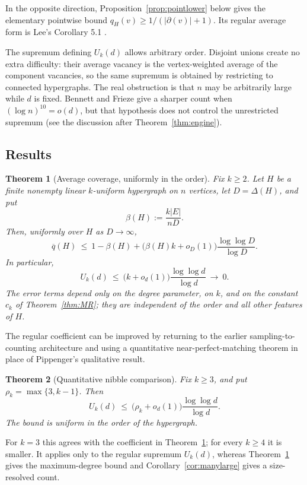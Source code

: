 \documentclass[10pt,a4paper]{amsart}
\newtheorem{theorem}{Theorem}[section]
\newcommand{\EE}{E}
\newcommand{\qbar}{\overline{q}}
\newcommand{\dg}{\partial}
\newcommand{\Deltaop}{\Delta}
\begin{document}
In the opposite direction, Proposition~\ref{prop:pointlower} below gives the elementary
pointwise bound $q_H(v)\ge1/(|\dg(v)|+1)$. Its regular average form is Lee's
Corollary 5.1 \cite[Corollary 5.1]{Lee}.

The supremum defining $U_k(d)$ allows arbitrary order. Disjoint unions create no extra
difficulty: their average vacancy is the vertex-weighted average of the component
vacancies, so the same supremum is obtained by restricting to connected hypergraphs. The
real obstruction is that $n$ may be arbitrarily large while $d$ is fixed. Bennett and
Frieze give a sharper count when $(\log n)^{10}=o(d)$, but that hypothesis does not control
the unrestricted supremum (see the discussion after Theorem~\ref{thm:engine}).

\subsection{Results}
\label{subsec:results}


\begin{theorem}[Average coverage, uniformly in the order]
\label{thm:main}
Fix $k\ge2$. Let $H$ be a finite nonempty linear $k$-uniform hypergraph on $n$ vertices,
let $D=\Deltaop(H)$, and put
\[
  \beta(H):=\frac{k|\EE|}{nD}.
\]
Then, uniformly over $H$ as $D\to\infty$,
\[
  \qbar(H)\ \le\ 1-\beta(H)
  +\bigl(\beta(H)k+o_D(1)\bigr)\frac{\log\log D}{\log D}.
\]
In particular,
\[
  U_k(d)\ \le\ \bigl(k+o_d(1)\bigr)\frac{\log\log d}{\log d}
  \ \longrightarrow\ 0.
\]
The error terms depend only on the degree parameter, on $k$, and on the constant $c_k$
of Theorem~\ref{thm:MR}; they are independent of the order and all other features of $H$.
\end{theorem}


The regular coefficient can be improved by returning to the earlier sampling-to-counting
architecture and using a quantitative near-perfect-matching theorem in place of
Pippenger's qualitative result.

\begin{theorem}[Quantitative nibble comparison]
\label{thm:nibble}
Fix $k\ge3$, and put $\rho_k=\max\{3,k-1\}$. Then
\[
  U_k(d)\ \le\ \bigl(\rho_k+o_d(1)\bigr)
  \frac{\log\log d}{\log d}.
\]
The bound is uniform in the order of the hypergraph.
\end{theorem}

For $k=3$ this agrees with the coefficient in Theorem~\ref{thm:main}; for every
$k\ge4$ it is smaller. It applies only to the regular supremum $U_k(d)$, whereas
Theorem~\ref{thm:main} gives the maximum-degree bound and Corollary~\ref{cor:manylarge}
gives a size-resolved count.
\end{document}
